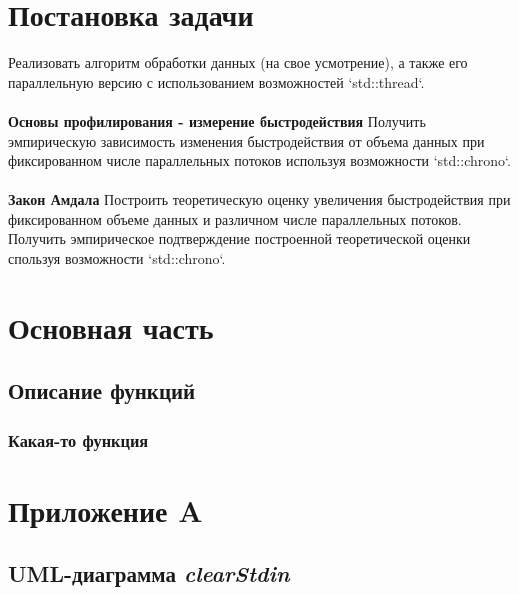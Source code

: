 \documentclass[a4paper, 12pt]{article}
\begin{document}
\cleardoublepage
\section*{Постановка задачи}
Реализовать алгоритм обработки данных (на свое усмотрение), а также его 
параллельную версию с использованием возможностей `std::thread`.
\\\\
\textbf{Основы профилирования - измерение быстродействия}
Получить эмпирическую зависимость изменения быстродействия от объема 
данных при фиксированном числе параллельных потоков используя возможности 
`std::chrono`.
\\\\
\textbf{Закон Амдала}
Построить теоретическую оценку увеличения быстродействия при фиксированном 
объеме данных и различном числе параллельных потоков.
Получить эмпирическое подтверждение построенной теоретической оценки спользуя 
возможности `std::chrono`.

\cleardoublepage



\section*{Основная часть}

\subsection{Описание функций}
\subsubsection{Какая-то функция}

\cleardoublepage


\section*{Приложение A}
\renewcommand\thesection{\Alph{section}}
\renewcommand\thesubsection{\thesection.\arabic{subsection}}
\setcounter{subsection}{0}

\subsection{UML-диаграмма \textit{clearStdin}}
\end{document}
